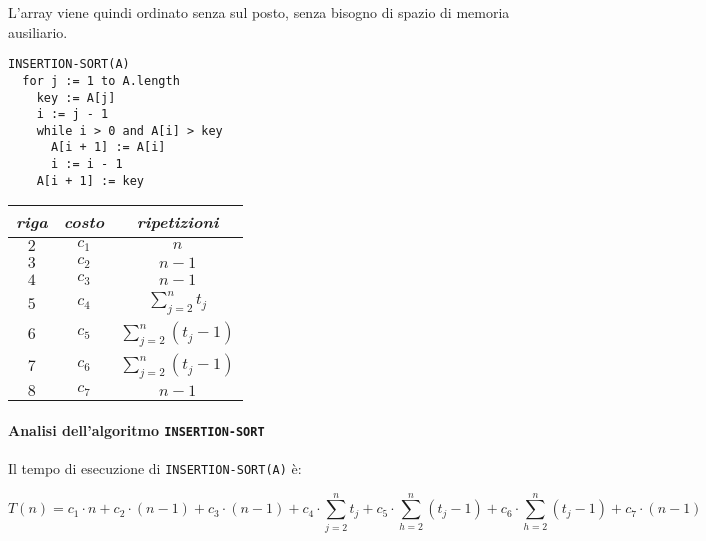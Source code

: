 \documentclass[italian, 10pt]{article}
\begin{document}
L'array viene quindi ordinato senza sul posto, senza bisogno di spazio di memoria ausiliario.

\begin{minipage}{0.99\textwidth}
  \bigskip
  \centering
  \begin{minipage}{0.45\textwidth}
    \centering
    \begin{lstlisting}[style=pseudocode, label={Pseudocodice dell'algoritmo di Insertion Sort}, label={lst:pseudocodice-insertion-sort}]
INSERTION-SORT(A)
  for j := 1 to A.length
    key := A[j]
    i := j - 1
    while i > 0 and A[i] > key
      A[i + 1] := A[i]
      i := i - 1
    A[i + 1] := key
    \end{lstlisting}
  \end{minipage}
  \begin{minipage}{0.45\textwidth}
    \centering
    \begin{tabular}{ccc}
      \textit{riga} & \textit{costo} & \textit{ripetizioni}     \\ \hline
      \(2\)         & \(c_1\)        & \(n\)                    \\
      \(3\)         & \(c_2\)        & \(n-1\)                  \\
      \(4\)         & \(c_3\)        & \(n-1\)                  \\
      \(5\)         & \(c_4\)        & \(\sum_{j=2}^n t_j\)     \\
      \(6\)         & \(c_5\)        & \(\sum_{j=2}^n (t_j-1)\) \\
      \(7\)         & \(c_6\)        & \(\sum_{j=2}^n (t_j-1)\) \\
      \(8\)         & \(c_7\)        & \(n-1\)                  \\
    \end{tabular}
  \end{minipage}
  \bigskip
\end{minipage}

\paragraph{Analisi dell'algoritmo \texttt{INSERTION-SORT}}

Il tempo di esecuzione di \texttt{INSERTION-SORT(A)} è:

\[ T(n) = c_1 \cdot n + c_2 \cdot (n-1) + c_3 \cdot (n-1) + c_4 \cdot \displaystyle \sum_{j=2}^n t_j + c_5 \cdot \displaystyle \sum_{h=2}^n (t_j - 1) + c_6 \cdot \displaystyle \sum_{h=2}^n (t_j - 1) + c_7 \cdot (n-1) \]
\end{document}
